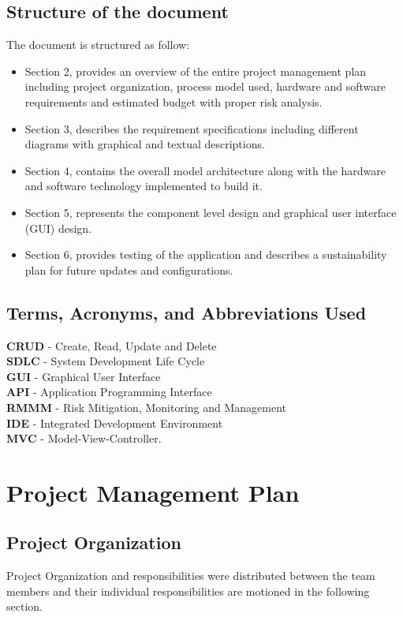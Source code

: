 \documentclass[11pt]{article} %
\begin{document}
	\subsection{Structure of the document}
	The document is structured as follow:
	\begin{itemize}
	\item Section 2, provides an overview of the entire project management plan including project organization, process model used, hardware and software requirements and estimated budget with proper risk analysis. 
	\item Section 3, describes the requirement specifications including different diagrams with graphical and textual descriptions. 
	\item Section 4, contains the overall model architecture along with the hardware and software technology implemented to build it.
	\item
	Section 5, represents the component level design and graphical user interface (GUI) design. \item Section 6, provides testing of the application and describes a sustainability plan for future updates and configurations.
	\end{itemize}
	
	\subsection{Terms, Acronyms, and Abbreviations Used}
	\textbf{CRUD} - Create, Read, Update and Delete\\
	\textbf{SDLC} - System Development Life Cycle\\
	\textbf{GUI} - Graphical User Interface\\ \textbf{API} - Application Programming Interface\\
	\textbf{RMMM} - Risk Mitigation, Monitoring and Management\\
	\textbf{IDE} - Integrated Development Environment\\
	\textbf{MVC} - Model-View-Controller.
	
\section{Project Management Plan}
	\subsection{Project Organization}
	Project Organization and responsibilities were distributed between the team members and their individual responsibilities are motioned in the following section. 
	
\end{document}
